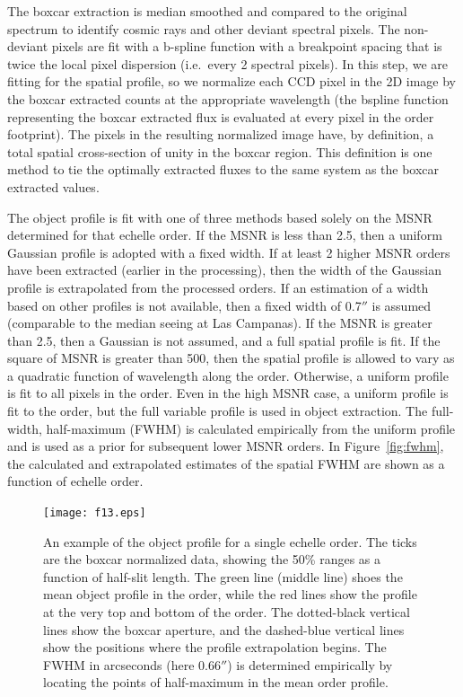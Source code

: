 \documentclass[]{emulateapj}
\begin{document}
The boxcar extraction is median smoothed and compared to the original spectrum
to identify cosmic rays and other deviant spectral pixels.  The non-deviant 
pixels are fit with a b-spline function with a breakpoint spacing that is twice
the local pixel dispersion (i.e.\ every 2 spectral pixels).
In this step, we are fitting for the spatial profile, so we normalize each 
CCD pixel in the 2D image by the boxcar extracted counts at the appropriate 
wavelength (the bspline function representing the boxcar extracted flux is
evaluated at every pixel in the order footprint).  
The pixels in the resulting normalized image have, by definition, a total 
spatial cross-section of unity in the boxcar region.
This definition is one method to tie the optimally extracted fluxes to the same 
system as the boxcar extracted values. 

The object profile is fit with one of three methods based solely on the
MSNR determined for that echelle order.  If the MSNR is less than 2.5, 
then a uniform Gaussian profile is adopted with a fixed width.  If at least 2 
higher MSNR orders have been extracted (earlier in the processing), then 
the width of the Gaussian profile is extrapolated from the processed orders.
If an estimation of a width based on other profiles is not available, then a
fixed width of 0.7$''$ is assumed (comparable to the median seeing at
Las Campanas).  If the MSNR is greater than 2.5, then a
Gaussian is not assumed, and a full spatial profile is fit.  If the square
of MSNR is greater than 500, then the spatial profile is allowed to vary as
a quadratic function of wavelength along the order.  
Otherwise, a uniform profile is fit to all pixels in the order.  
Even in the high MSNR case, a uniform profile
is fit to the order, but the full variable profile is used in object 
extraction.  The full-width, half-maximum (FWHM) is calculated empirically
from the uniform profile and is used as a prior for subsequent lower MSNR 
orders.  In Figure~\ref{fig:fwhm}, the calculated and extrapolated 
estimates of the spatial FWHM are shown as a function of echelle order.



\begin{figure}
\texttt{[image: f13.eps]}
\caption{An example of the object profile for a single echelle order.  
The ticks
are the boxcar normalized data, showing the 50\% ranges as a function of
half-slit length.  The green line (middle line) shoes the mean
object profile in the order, while the red lines show the profile at the very
top and bottom of the order.
The dotted-black vertical lines show the boxcar aperture, and the 
dashed-blue vertical lines
show the positions where the profile extrapolation begins.  
The FWHM in arcseconds (here 0.66$''$) 
is determined empirically by locating the points of half-maximum in the 
mean order profile.
}
\label{fig:profile}
\end{figure}
\end{document}
